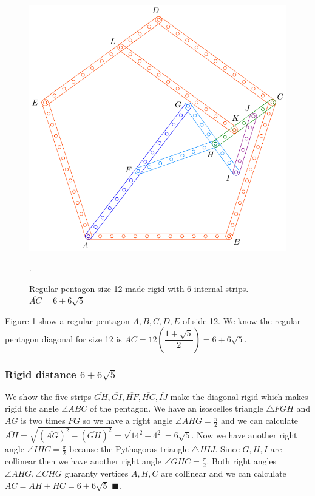\documentclass[11pt]{article}
\begin{document}
\begin{figure}[h]
 \centering
 \includegraphics[scale=0.8]{12/penta12-6a}
 \caption{Regular pentagon size 12 made rigid with 6 internal strips. $\overline{AC} = 6 + 6\sqrt5$}.
 \label{fig:penta12-6a}
\end{figure}

Figure \ref{fig:penta12-6a} show a regular pentagon $A,B,C,D,E$ of side 12. We know the regular pentagon diagonal for size 12 is $\overline{AC} = 12\left(\dfrac{1+\sqrt5}2\right) = 6 + 6\sqrt5$. 

\subsubsection{Rigid distance $6 + 6\sqrt5$}

We show the five strips $\overline{GH},\overline{GI},\overline{HF},\overline{HC},\overline{IJ}$ make the diagonal rigid which makes rigid the angle $\angle{ABC}$ of the pentagon. We have an isoscelles triangle $\triangle{FGH}$ and $\overline{AG}$ is two times $\overline{FG}$ so we have a right angle $\angle{AHG} = \frac{\pi}2$ and we can calculate $\overline{AH} = \sqrt{(\overline{AG})^2 - (\overline{GH})^2} = \sqrt{14^2-4^2} = 6\sqrt5$. Now we have another right angle $\angle{IHC} = \frac{\pi}2$ because the Pythagoras triangle $\triangle{HIJ}$. Since $G,H,I$ are collinear then we have another right angle $\angle{GHC}=\frac{\pi}2$. Both right angles $\angle{AHG},\angle{CHG}$ guaranty vertices $A,H,C$ are collinear and we can calculate $\overline{AC} = \overline{AH} + \overline{HC} = 6 + 6\sqrt5$ $\blacksquare$.
\end{document}
